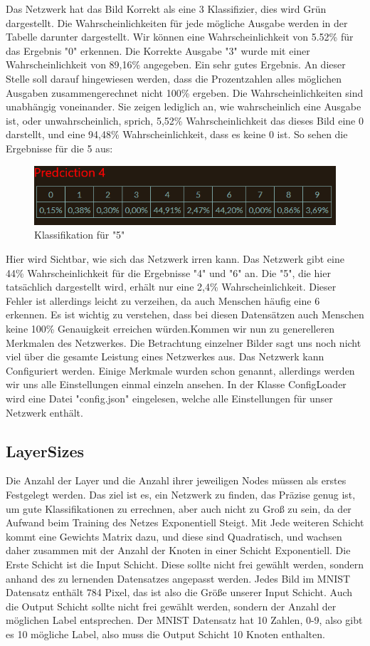 \documentclass[12pt]{article}
\begin{document}
Das Netzwerk hat das Bild Korrekt als eine 3 Klassifizier, dies wird Grün dargestellt. Die Wahrscheinlichkeiten für jede mögliche Ausgabe werden in der Tabelle darunter dargestellt. Wir können eine Wahrscheinlichkeit von 5.52\% für das Ergebnis "0" erkennen. Die Korrekte Ausgabe "3" wurde mit einer Wahrscheinlichkeit von 89,16\% angegeben. Ein sehr gutes Ergebnis. An dieser Stelle soll darauf hingewiesen werden, dass die Prozentzahlen alles möglichen Ausgaben zusammengerechnet nicht 100\% ergeben. Die Wahrscheinlichkeiten sind unabhängig voneinander. Sie zeigen lediglich an, wie wahrscheinlich eine Ausgabe ist, oder unwahrscheinlich, sprich, 5,52\% Wahrscheinlichkeit das dieses Bild eine 0 darstellt, und eine 94,48\% Wahrscheinlichkeit, dass es keine 0 ist.
So sehen die Ergebnisse für die 5 aus:\begin{figure}[H]
\centering
\includegraphics[scale=0.60]{./Images/Pasted image 20231001134329.png}
\caption{Klassifikation für "5"}
\label{Was kommt hier rein?}
\end{figure}
Hier wird Sichtbar, wie sich das Netzwerk irren kann. Das Netzwerk gibt eine 44\% Wahrscheinlichkeit für die Ergebnisse "4" und "6" an. Die "5", die hier tatsächlich dargestellt wird, erhält nur eine 2,4\% Wahrscheinlichkeit. Dieser Fehler ist allerdings leicht zu verzeihen, da auch Menschen häufig eine 6 erkennen. Es ist wichtig zu verstehen, dass bei diesen Datensätzen auch Menschen keine 100\% Genauigkeit erreichen würden.Kommen wir nun zu generelleren Merkmalen des Netzwerkes. Die Betrachtung einzelner Bilder sagt uns noch nicht viel über die gesamte Leistung eines Netzwerkes aus. Das Netzwerk kann Configuriert werden. Einige Merkmale wurden schon genannt, allerdings werden wir uns alle Einstellungen einmal einzeln ansehen. In der Klasse ConfigLoader wird eine Datei "config.json" eingelesen, welche alle Einstellungen für unser Netzwerk enthält.
\subsection{LayerSizes}
Die Anzahl der Layer und die Anzahl ihrer jeweiligen Nodes müssen als erstes Festgelegt werden. Das ziel ist es, ein Netzwerk zu finden, das Präzise genug ist, um gute Klassifikationen zu errechnen, aber auch nicht zu Groß zu sein, da der Aufwand beim Training des Netzes Exponentiell Steigt. Mit Jede weiteren Schicht kommt eine Gewichts Matrix dazu, und diese sind Quadratisch, und wachsen daher zusammen mit der Anzahl der Knoten in einer Schicht Exponentiell. 
Die Erste Schicht ist die Input Schicht. Diese sollte nicht frei gewählt werden, sondern anhand des zu lernenden Datensatzes angepasst werden. Jedes Bild im MNIST Datensatz enthält 784 Pixel, das ist also die Größe unserer Input Schicht.
Auch die Output Schicht sollte nicht frei gewählt werden, sondern der Anzahl der möglichen Label entsprechen. Der MNIST Datensatz hat 10 Zahlen, 0-9, also gibt es 10 mögliche Label, also muss die Output Schicht 10 Knoten enthalten.
\end{document}
